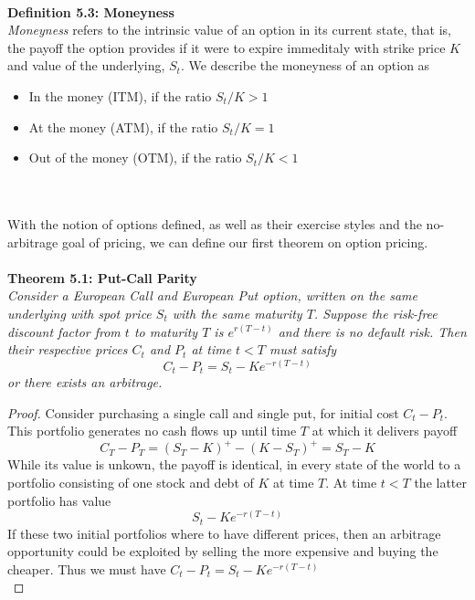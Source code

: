 \documentclass{article}
\begin{document}
\\
\textbf{Definition 5.3: Moneyness} \\
\textit{Moneyness} refers to the intrinsic value of an option in its current state, that is, the payoff the option provides if it were to expire immeditaly with strike price $K$ and value of the underlying, $S_t$. We describe the moneyness of an option as \begin{itemize}
    \item In the money (ITM), if the ratio $S_t/K>1$
    \item At the money (ATM), if the ratio $S_t/K=1$
    \item Out of the money (OTM), if the ratio $S_t/K<1$
\end{itemize} 
\\
\\
With the notion of options defined, as well as their exercise styles and the no-arbitrage goal of pricing, we can define our first theorem on option pricing. \\
\\
\textbf{Theorem 5.1: Put-Call Parity}\\
\textit{Consider a European Call and European Put option, written on the same underlying with spot price $S_t$ with the same maturity $T$. Suppose the risk-free discount factor from $t$ to maturity $T$ is $e^{r(T-t)}$ and there is no default risk. Then their respective prices $C_t$ and $P_t$ at time $t<T$ must satisfy
$$C_t - P_t = S_t - Ke^{-r(T-t)}$$
or there exists an arbitrage.}
\begin{proof}
Consider purchasing a single call and single put, for initial cost $C_t - P_t$. This portfolio generates no cash flows up until time $T$ at which it delivers payoff
$$C_T - P_T = (S_T - K)^+ - (K - S_T)^+ = S_T - K$$
While its value is unkown, the payoff is identical, in every state of the world to a portfolio consisting of one stock and debt of $K$ at time $T$. At time $t<T$ the latter portfolio has value
$$S_t-K e^{-r(T-t)}$$
If these two initial portfolios where to have different prices, then an arbitrage opportunity could be exploited by selling the more expensive and buying the cheaper. Thus we must have $C_t - P_t = S_t - Ke^{-r(T-t)}$ \\ 
\end{proof}
\end{document}
